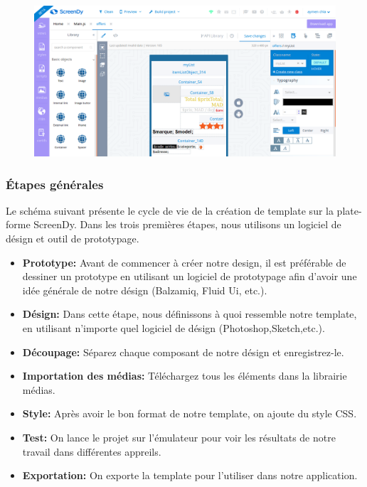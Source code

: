 \documentclass[12pt,a4paper]{report}
\begin{document}
		
		\begin{figure}[!hbtp]
			\centering
			\includegraphics[scale=0.3]{./graphics/vue_screendy.png}
		\end{figure}
		\newpage

	
			\subsubsection{\'Etapes générales}
Le schéma suivant présente le cycle de vie de la création de template sur la plate-forme ScreenDy.
Dans les trois premières étapes, nous utilisons un logiciel de désign et outil de prototypage.
		
			\begin{itemize}
				\item \textbf{Prototype:} Avant de commencer à créer notre design, il est préférable de dessiner un prototype en utilisant un logiciel de prototypage afin d'avoir une idée générale de notre désign (Balzamiq, Fluid Ui, etc.).
				\item \textbf{Désign:} Dans cette étape, nous définissons à quoi ressemble notre template, en utilisant n'importe quel logiciel de désign (Photoshop,Sketch,etc.).
				\item \textbf{Découpage:} Séparez chaque composant de notre désign et enregistrez-le.
				\item \textbf{Importation des médias:} Téléchargez tous les éléments dans la librairie médias.
				\item \textbf{Style:} Après avoir le bon format de notre template, on ajoute du style CSS.
				\item \textbf{Test:} On lance le projet sur l'émulateur pour voir les résultats de notre travail dans différentes appreils.
				\item \textbf{Exportation:} On exporte la template pour l'utiliser dans notre application.
			\end{itemize}
		
\end{document}
